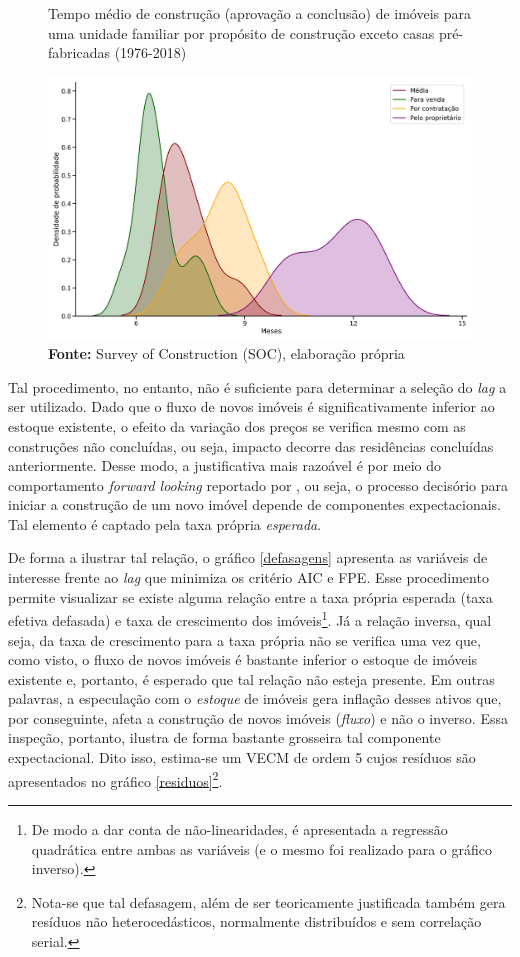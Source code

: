 \begin{figure}[htb]
	\centering
	\caption{Tempo médio de construção (aprovação a conclusão) de imóveis para uma unidade familiar por propósito de construção exceto casas pré-fabricadas (1976-2018)}
	\label{meses}
	\includegraphics[width=\textwidth]{Fatos_Estilizados/Figs/Meses_contrucao.png}
	\caption*{\textbf{Fonte:} Survey of Construction (SOC), elaboração própria}
\end{figure}
Tal procedimento, no entanto, não é suficiente para determinar a seleção do \textit{lag} a ser utilizado. Dado que o fluxo de novos imóveis é significativamente inferior ao estoque existente, o efeito da variação dos preços se verifica mesmo com as construções não concluídas, ou seja, impacto decorre das residências concluídas anteriormente. Desse modo, a justificativa mais razoável é por meio do comportamento \textit{forward looking} reportado por \textcite{green_follow_1997}, ou seja, o processo decisório para iniciar a construção de um novo imóvel depende de componentes expectacionais. Tal elemento é captado pela taxa própria \textit{esperada}. 

De forma a ilustrar tal relação, o gráfico \ref{defasagens} apresenta as variáveis de interesse frente ao \textit{lag} que minimiza os critério AIC e FPE. Esse procedimento permite visualizar se existe alguma relação entre a taxa própria esperada (taxa efetiva defasada) e taxa de crescimento dos imóveis\footnote{De modo a dar conta de não-linearidades, é apresentada a regressão quadrática entre ambas as variáveis (e o mesmo foi realizado para o gráfico inverso).}. Já a relação inversa, qual seja, da taxa de crescimento para a taxa própria não se verifica uma vez que, como visto, o fluxo de novos imóveis é bastante inferior o estoque de imóveis existente e, portanto, é esperado que tal relação não esteja presente. Em outras palavras, a especulação com o \textit{estoque}  de imóveis gera inflação desses ativos que, por conseguinte, afeta a construção de novos imóveis (\textit{fluxo}) e não o inverso. Essa inspeção, portanto, ilustra de forma bastante grosseira tal componente expectacional.  Dito isso,  estima-se um VECM de ordem 5 cujos resíduos são apresentados no gráfico \ref{residuos}\footnote{Nota-se que tal defasagem, além de ser teoricamente justificada também gera resíduos não heterocedásticos, normalmente distribuídos e sem correlação serial.}.

